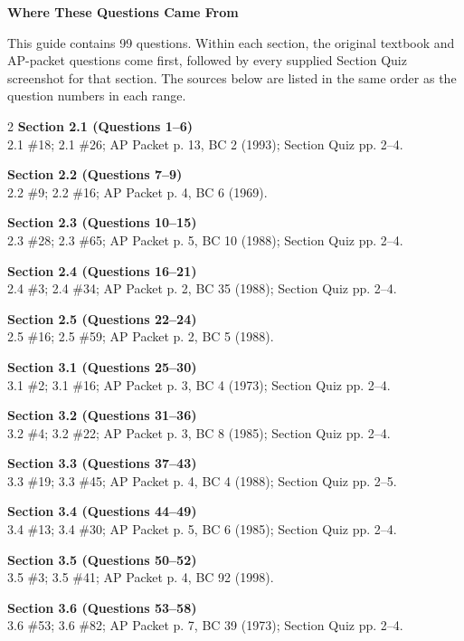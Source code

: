 \documentclass[11pt]{article}
\begin{document}
\fi
\begin{center}{\LARGE\bfseries Where These Questions Came From}\end{center}
\medskip
\noindent This guide contains 99 questions. Within each section, the original textbook and AP-packet questions come first, followed by every supplied Section Quiz screenshot for that section. The sources below are listed in the same order as the question numbers in each range.
\medskip
\begin{multicols}{2}
\small
\noindent\textbf{Section 2.1 (Questions 1--6)}\\
2.1 \#18; 2.1 \#26; AP Packet p. 13, BC 2 (1993); Section Quiz pp. 2--4.

\smallskip
\noindent\textbf{Section 2.2 (Questions 7--9)}\\
2.2 \#9; 2.2 \#16; AP Packet p. 4, BC 6 (1969).

\smallskip
\noindent\textbf{Section 2.3 (Questions 10--15)}\\
2.3 \#28; 2.3 \#65; AP Packet p. 5, BC 10 (1988); Section Quiz pp. 2--4.

\smallskip
\noindent\textbf{Section 2.4 (Questions 16--21)}\\
2.4 \#3; 2.4 \#34; AP Packet p. 2, BC 35 (1988); Section Quiz pp. 2--4.

\smallskip
\noindent\textbf{Section 2.5 (Questions 22--24)}\\
2.5 \#16; 2.5 \#59; AP Packet p. 2, BC 5 (1988).

\smallskip
\noindent\textbf{Section 3.1 (Questions 25--30)}\\
3.1 \#2; 3.1 \#16; AP Packet p. 3, BC 4 (1973); Section Quiz pp. 2--4.

\smallskip
\noindent\textbf{Section 3.2 (Questions 31--36)}\\
3.2 \#4; 3.2 \#22; AP Packet p. 3, BC 8 (1985); Section Quiz pp. 2--4.

\smallskip
\noindent\textbf{Section 3.3 (Questions 37--43)}\\
3.3 \#19; 3.3 \#45; AP Packet p. 4, BC 4 (1988); Section Quiz pp. 2--5.

\smallskip
\noindent\textbf{Section 3.4 (Questions 44--49)}\\
3.4 \#13; 3.4 \#30; AP Packet p. 5, BC 6 (1985); Section Quiz pp. 2--4.

\smallskip
\noindent\textbf{Section 3.5 (Questions 50--52)}\\
3.5 \#3; 3.5 \#41; AP Packet p. 4, BC 92 (1998).

\smallskip
\noindent\textbf{Section 3.6 (Questions 53--58)}\\
3.6 \#53; 3.6 \#82; AP Packet p. 7, BC 39 (1973); Section Quiz pp. 2--4.


\end{multicols}
\end{document}

